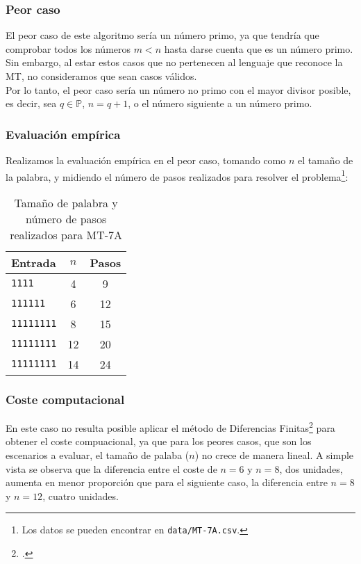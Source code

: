 

\subsubsection*{Peor caso}
El peor caso de este algoritmo sería un número primo, ya que tendría que comprobar todos los números $m < n$ hasta darse cuenta que es un número primo. Sin embargo, al estar estos casos que no pertenecen al lenguaje que reconoce la MT, no consideramos que sean casos válidos.\\
Por lo tanto, el peor caso sería un número no primo con el mayor divisor posible, es decir, sea $q \in \mathbb{P}$, $n = q + 1$, o el número siguiente a un número primo.


\subsubsection*{Evaluación empírica}
Realizamos la evaluación empírica en el peor caso, tomando como $n$ el tamaño de la palabra, y midiendo el número de pasos realizados para resolver el problema\footnote{Los datos se pueden encontrar en \texttt{data/MT-7A.csv}.}:

\begin{table}[h]
    \centering
    \begin{tabular}{lcc}
        Entrada & $n$ & Pasos \\
        \hline
        \texttt{1111}              &  4   & 9  \\
        \texttt{111111}            &  6   & 12 \\
        \texttt{11111111}          &  8   & 15 \\
        \texttt{11111111}          &  12  & 20 \\
        \texttt{11111111}          &  14  & 24 \\
    \end{tabular}
    \caption{Tamaño de palabra y número de pasos realizados para MT-7A}
\end{table}


\subsubsection*{Coste computacional}

En este caso no resulta posible aplicar el método de Diferencias Finitas\footcite[ver][pgs. 1-42: \textit{Chapter 1. Difference Tables and Polynomial Fits}]{cuoco2005mathematical} para obtener el coste compuacional, ya que para los peores casos, que son los escenarios a evaluar, el tamaño de palaba ($n$) no crece de manera lineal. A simple vista se observa que la diferencia entre el coste de $n=6$ y $n=8$, dos unidades, aumenta en menor proporción que para el siguiente caso, la diferencia entre $n=8$ y $n=12$, cuatro unidades.\medskip

